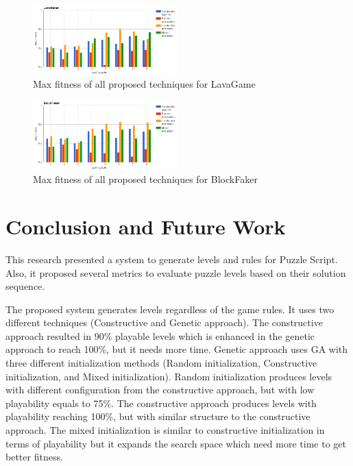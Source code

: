 \documentclass[letterpaper]{article}
\begin{document}
\begin{figure}
  	\centering
    \includegraphics[width=0.5\textwidth]{Images/lavaGameComparison}
    \caption{Max fitness of all proposed techniques for LavaGame}
    \label{Figure:lavaGameComparisonmparison}
\end{figure}

\begin{figure}
  	\centering
    \includegraphics[width=0.5\textwidth]{Images/blockFakerComparison}
    \caption{Max fitness of all proposed techniques for BlockFaker}
    \label{Figure:blockFakerComparison}
\end{figure}

\section{Conclusion and Future Work}
This research presented a system to generate levels and rules for Puzzle Script. Also, it proposed several metrics to evaluate puzzle levels based on their solution sequence.\\\par

The proposed system generates levels regardless of the game rules. It uses two different techniques (Constructive and Genetic approach). The constructive approach resulted in 90\% playable levels which is enhanced in the genetic approach to reach 100\%, but it needs more time. Genetic approach uses GA with three different initialization methods (Random initialization, Constructive initialization, and Mixed initialization). Random initialization produces levels with different configuration from the constructive approach, but with low playability equals to 75\%.  The constructive approach produces levels with playability reaching 100\%, but with similar structure to the constructive approach. The mixed initialization is similar to constructive initialization in terms of playability but it expands the search space which need more time to get better fitness.\\\par
\end{document}
